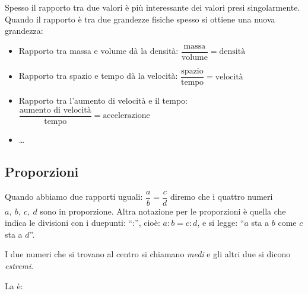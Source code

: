 \begin{esempio}{}{}
~

\\

\end{esempio}

Spesso il rapporto tra due valori è più interessante dei valori presi 
singolarmente. 
Quando il rapporto è tra due grandezze fisiche spesso si 
ottiene una nuova grandezza:
\begin{itemize} [noitemsep]
 \item Rapporto tra massa e volume dà la densità: 
 \(\dfrac{\text{massa}}{\text{volume}}=\text{densità}\)
 \item Rapporto tra spazio e tempo dà la velocità: 
 \(\dfrac{\text{spazio}}{\text{tempo}}=\text{velocità}\)
 \item Rapporto tra l'aumento di velocità e il tempo: 
 \(\dfrac{\text{aumento di velocità}}{\text{tempo}}=\text{accelerazione}\)
 \item \dots
\end{itemize}

\subsection{Proporzioni}

Quando abbiamo due rapporti uguali: \(\dfrac{a}{b} = \dfrac{c}{d}\) 
diremo che i quattro numeri \(a,~b,~c,~d\) sono in proporzione. 
Altra notazione per le proporzioni è quella che indica le divisioni con 
i duepunti: ``:'', cioè: \quad \(a:b=c:d\), \quad e si legge: \quad 
``\(a\) sta a \(b\) come \(c\) sta a \(d\)''.

I due numeri che si trovano al centro si chiamano \emph{medi} e gli 
altri due si dicono \emph{estremi}.

La  è:

